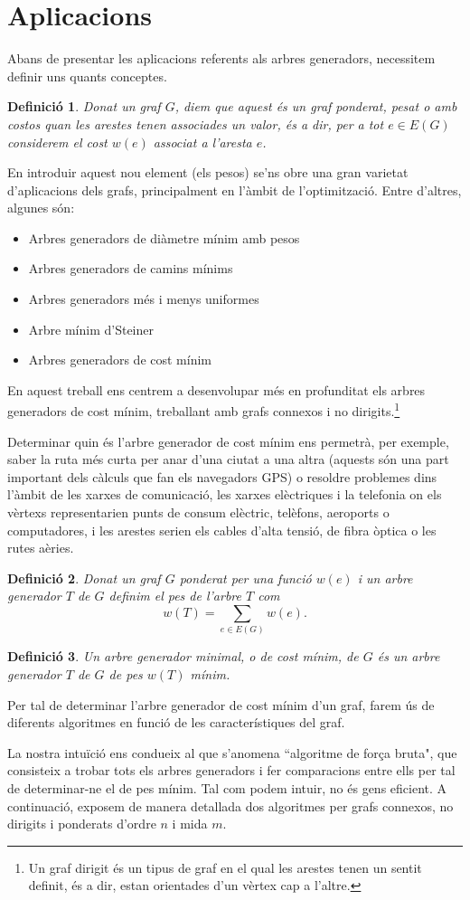 \documentclass{article}
\newtheorem{definition}{Definició}[section]
\begin{document}
\section{Aplicacions}
Abans de presentar les aplicacions referents als arbres generadors, necessitem definir uns quants conceptes.
\begin{definition}
    Donat un graf $G$, diem que aquest és un graf ponderat, pesat o amb costos quan les arestes tenen associades un valor, és a dir, per a tot $e\in E(G)$ considerem el cost $w(e)$ associat a l'aresta $e$.
\end{definition}
En introduir aquest nou element (els pesos) se'ns obre una gran varietat d’aplicacions dels grafs, principalment en l’àmbit de l’optimització. Entre d'altres, algunes són:
\begin{itemize}
    \item Arbres generadors de diàmetre mínim amb pesos
    \item Arbres generadors de camins mínims
    \item Arbres generadors més i menys uniformes
    \item Arbre mínim d’Steiner
    \item Arbres generadors de cost mínim
\end{itemize}
En aquest treball ens centrem a desenvolupar més en profunditat els arbres generadors de cost mínim, treballant amb grafs connexos i no dirigits.\footnote{Un graf dirigit és un tipus de graf en el qual les arestes tenen un sentit definit, és a dir, estan orientades d'un vèrtex cap a l'altre.}\par

Determinar quin és l’arbre generador de cost mínim ens permetrà, per exemple, saber la ruta més curta per anar d’una ciutat a una altra (aquests són una part important dels càlculs que fan els navegadors GPS) o resoldre problemes dins l’àmbit de les xarxes de comunicació, les xarxes elèctriques i la telefonia on els vèrtexs representarien punts de consum elèctric, telèfons, aeroports o computadores, i les arestes serien els cables d’alta tensió, de fibra òptica o les rutes aèries.
\begin{definition}
    Donat un graf $G$ ponderat per una funció $w(e)$ i un arbre generador $T$ de $G$ definim el pes de l’arbre $T$ com $$w(T)=\sum_{e\in E(G)} w(e).$$
\end{definition}
\begin{definition}
    Un arbre generador minimal, o de cost mínim, de $G$ és un arbre generador $T$ de $G$ de pes $w(T)$ mínim.
\end{definition}
Per tal de determinar l’arbre generador de cost mínim d’un graf, farem ús de diferents algoritmes en funció de les característiques del graf.\par La nostra intuïció ens condueix al que s'anomena ``algoritme de força bruta", que consisteix a trobar tots els arbres generadors i fer comparacions entre ells per tal de determinar-ne el de pes mínim. Tal com podem intuir, no és gens eficient. A continuació, exposem de manera detallada dos algoritmes per grafs connexos, no dirigits i ponderats d’ordre $n$ i mida $m$.
\end{document}
